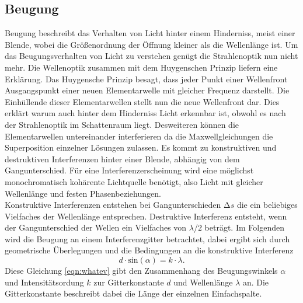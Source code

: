 \subsection{Beugung}
Beugung beschreibt das Verhalten von Licht hinter einem Hinderniss, meist einer Blende, wobei die Größenordnung der Öffnung kleiner als die Wellenlänge ist.
Um das Beugungsverhalten von Licht zu verstehen genügt die Strahlenoptik nun nicht mehr. Die Wellenoptik zusammen mit dem Huygenschen Prinzip liefern eine Erklärung. Das Huygensche Prinzip besagt, dass jeder Punkt einer Wellenfront
Ausgangspunkt einer neuen Elementarwelle mit gleicher Frequenz darstellt. Die Einhüllende dieser Elementarwellen stellt nun die neue Wellenfront dar. Dies erklärt warum auch hinter dem Hinderniss Licht erkennbar ist, obwohl es 
nach der Strahlenoptik im Schattenraum liegt. Desweiteren können die Elementarwellen untereinander interferieren da die Maxwellgleichungen die Superposition einzelner Lösungen zulassen. Es kommt zu konstruktiven und destruktiven
Interferenzen hinter einer Blende, abhängig von dem Gangunterschied. Für eine Interferenzerscheinung wird eine möglichst monochromatisch kohärente Lichtquelle benötigt, also Licht mit gleicher Wellenlänge und festen Phasenbeziehungen.
\\
Konstruktive Interferenzen entstehen bei Gangunterschieden $\increment s$ die ein beliebiges Vielfaches der Wellenlänge entsprechen. Destruktive Interferenz entsteht, wenn der Gangunterschied der Wellen ein Vielfaches von $\lambda$/$2$ beträgt.
Im Folgenden wird die Beugung an einem Interferenzgitter betrachtet, dabei ergibt sich durch geometrische Überlegungen und die Bedingungen an die konstruktive Interferenz
\begin{equation}
    \label{eqn:whatev}
d \cdot \text{sin}(\alpha) = k \cdot \lambda.
\end{equation}
Diese Gleichung \eqref{eqn:whatev} gibt den Zusammenhang des Beugungswinkels $\alpha$ und Intensitätsordung $k$ zur Gitterkonstante $d$ und Wellenlänge $\lambda$ an. Die Gitterkonstante beschreibt dabei die Länge der einzelnen Einfachspalte.
